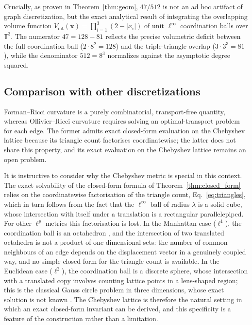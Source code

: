 \documentclass[aps,pre,onecolumn,10pt,groupedaddress,amsmath,amssymb,floatfix]{revtex4-2}
\begin{document}
Crucially, as proven in Theorem~\ref{thm:geom}, $47/512$ is not an ad hoc artifact of graph discretization, but the exact analytical result of integrating the overlapping volume function $V_{\text{int}}(\mathbf{x}) = \prod_{i=1}^3 (2 - |x_i|)$ of unit $\ell^\infty$ coordination balls over $\mathbb{T}^3$. The numerator $47 = 128 - 81$ reflects the precise volumetric deficit between the full coordination ball ($2 \cdot 8^2 = 128$) and the triple-triangle overlap ($3 \cdot 3^3 = 81$), while the denominator $512 = 8^3$ normalizes against the asymptotic degree squared.

\subsection{Comparison with other discretizations}

Forman--Ricci curvature is a purely combinatorial, transport-free quantity, whereas Ollivier--Ricci curvature \cite{ollivier2009ricci} requires solving an optimal-transport problem for each edge. The former admits exact closed-form evaluation on the Chebyshev lattice because its triangle count factorises coordinatewise; the latter does not share this property, and its exact evaluation on the Chebyshev lattice remains an open problem.

It is instructive to consider why the Chebyshev metric is special in this context. The exact solvability of the closed-form formula of Theorem~\ref{thm:closed_form} relies on the coordinatewise factorisation of the triangle count, Eq.~\eqref{eq:triangles}, which in turn follows from the fact that the $\ell^\infty$ ball of radius $\lambda$ is a solid cube, whose intersection with itself under a translation is a rectangular parallelepiped. For other $\ell^p$ metrics this factorisation is lost. In the Manhattan case ($\ell^1$), the coordination ball is an octahedron \cite{conway1999sphere}, and the intersection of two translated octahedra is not a product of one-dimensional sets: the number of common neighbours of an edge depends on the displacement vector in a genuinely coupled way, and no simple closed form for the triangle count is available. In the Euclidean case ($\ell^2$), the coordination ball is a discrete sphere, whose intersection with a translated copy involves counting lattice points in a lens-shaped region; this is the classical Gauss circle problem in three dimensions, whose exact solution is not known \cite{conway1999sphere}. The Chebyshev lattice is therefore the natural setting in which an exact closed-form invariant can be derived, and this specificity is a feature of the construction rather than a limitation.
\end{document}
